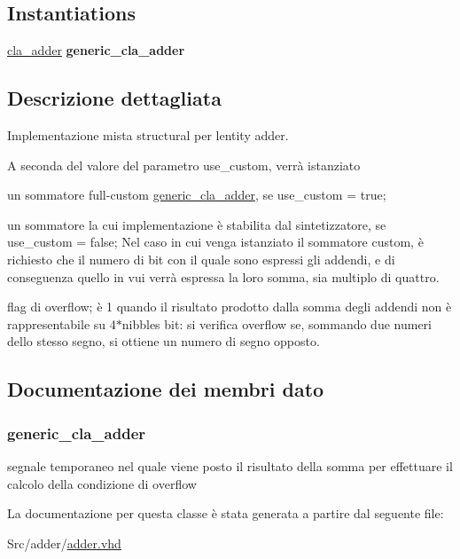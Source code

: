 \subsection*{Instantiations}
 \begin{DoxyCompactItemize}
\item 
\hyperlink{classadder_1_1structural_a94015e32a32cd4c5be09b1ddde822259}{cla\+\_\+adder}  {\bfseries generic\+\_\+cla\+\_\+adder}   
\end{DoxyCompactItemize}


\subsection{Descrizione dettagliata}
Implementazione mista structural per l\textquotesingle{}entity adder.

A seconda del valore del parametro use\+\_\+custom, verrà istanziato
\begin{DoxyItemize}
\item un sommatore full-\/custom \hyperlink{classgeneric__cla__adder}{generic\+\_\+cla\+\_\+adder}, se use\+\_\+custom = true;
\item un sommatore la cui implementazione è stabilita dal sintetizzatore, se use\+\_\+custom = false; Nel caso in cui venga istanziato il sommatore custom, è richiesto che il numero di bit con il quale sono espressi gli addendi, e di conseguenza quello in vui verrà espressa la loro somma, sia multiplo di quattro. 
\end{DoxyItemize}

flag di overflow; è \textquotesingle{}1\textquotesingle{} quando il risultato prodotto dalla somma degli addendi non è rappresentabile su 4$\ast$nibbles bit\+: si verifica overflow se, sommando due numeri dello stesso segno, si ottiene un numero di segno opposto. 

\subsection{Documentazione dei membri dato}
\subsubsection[{\texorpdfstring{cla\+\_\+adder}{cla_adder}}]{ {\bfseries \textcolor{vhdlchar}{generic\+\_\+cla\+\_\+adder}\textcolor{vhdlchar}{ }} \hspace{0.3cm}{\ttfamily [Instantiation]}}\hypertarget{classadder_1_1structural_a94015e32a32cd4c5be09b1ddde822259}{}\label{classadder_1_1structural_a94015e32a32cd4c5be09b1ddde822259}
segnale temporaneo nel quale viene posto il risultato della somma per effettuare il calcolo della condizione di overflow 

La documentazione per questa classe è stata generata a partire dal seguente file\+:\begin{DoxyCompactItemize}
\item 
Src/adder/\hyperlink{adder_8vhd}{adder.\+vhd}\end{DoxyCompactItemize}
